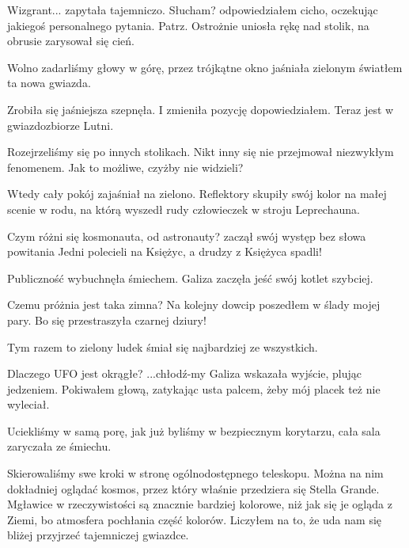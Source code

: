 \begin{dialogue}
	\ds{} Wizgrant... \dm{} zapytała tajemniczo.
	\ds{} Słucham? \dm{} odpowiedziałem cicho, oczekując jakiegoś personalnego pytania.
	\ds{} Patrz. \dm{} Ostrożnie uniosła rękę nad stolik, na obrusie zarysował się cień.
\end{dialogue}

Wolno zadarliśmy głowy w górę, przez trójkątne okno jaśniała zielonym światłem ta nowa gwiazda.

\begin{dialogue}
	\ds{} Zrobiła się jaśniejsza \dm{} szepnęła.
	\ds{} I zmieniła pozycję \dm{} dopowiedziałem. \dm{} Teraz jest w gwiazdozbiorze Lutni.
\end{dialogue}

Rozejrzeliśmy się po innych stolikach. Nikt inny się nie przejmował niezwykłym fenomenem.
Jak to możliwe, czyżby nie widzieli?

Wtedy cały pokój zajaśniał na zielono.
Reflektory skupiły swój kolor na małej scenie w rodu, na którą wyszedł rudy człowieczek w stroju Leprechauna. 
\begin{dialogue}
	\ds{} Czym różni się kosmonauta, od astronauty? \dm{} zaczął swój występ bez słowa powitania \dm{} Jedni polecieli na Księżyc, a drudzy z Księżyca spadli!
\end{dialogue}

Publiczność wybuchnęła śmiechem. Galiza zaczęła jeść swój kotlet szybciej.

\begin{dialogue}
	\ds{} Czemu próżnia jest taka zimna? \dm{} Na kolejny dowcip poszedłem w ślady mojej pary. \dm{} Bo się przestraszyła czarnej dziury!
\end{dialogue}

Tym razem to zielony ludek śmiał się najbardziej ze wszystkich.

\begin{dialogue}
	\ds{} Dlaczego UFO jest okrągłe?
	\ds{} ...chłodź-my \dm{} Galiza wskazała wyjście, plując jedzeniem. Pokiwałem głową, zatykając usta palcem, żeby mój placek też nie wyleciał.
\end{dialogue}

Uciekliśmy w samą porę, jak już byliśmy w bezpiecznym korytarzu, cała sala zaryczała ze śmiechu.

Skierowaliśmy swe kroki w stronę ogólnodostępnego teleskopu.
Można na nim dokładniej oglądać kosmos, przez który właśnie przedziera się Stella Grande.
Mgławice w rzeczywistości są znacznie bardziej kolorowe, niż jak się je ogląda z Ziemi, bo atmosfera pochłania część kolorów.
Liczyłem na to, że uda nam się bliżej przyjrzeć tajemniczej gwiazdce.

